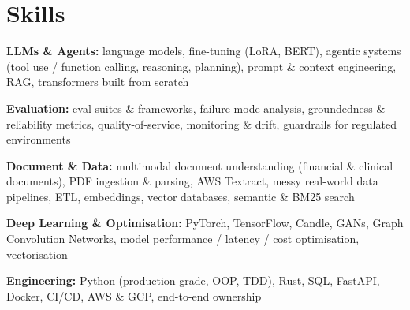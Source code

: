 \documentclass[10pt,a4paper]{article}
\begin{document}
\section{Skills}
\begin{tight}
  \item[\textcolor{accent}{\small$\bullet$}] \textbf{LLMs \& Agents:} language models, fine-tuning (LoRA, BERT), agentic systems (tool use / function calling, reasoning, planning), prompt \& context engineering, RAG, transformers built from scratch
  \item[\textcolor{accent}{\small$\bullet$}] \textbf{Evaluation:} eval suites \& frameworks, failure-mode analysis, groundedness \& reliability metrics, quality-of-service, monitoring \& drift, guardrails for regulated environments
  \item[\textcolor{accent}{\small$\bullet$}] \textbf{Document \& Data:} multimodal document understanding (financial \& clinical documents), PDF ingestion \& parsing, AWS Textract, messy real-world data pipelines, ETL, embeddings, vector databases, semantic \& BM25 search
  \item[\textcolor{accent}{\small$\bullet$}] \textbf{Deep Learning \& Optimisation:} PyTorch, TensorFlow, Candle, GANs, Graph Convolution Networks, model performance / latency / cost optimisation, vectorisation
  \item[\textcolor{accent}{\small$\bullet$}] \textbf{Engineering:} Python (production-grade, OOP, TDD), Rust, SQL, FastAPI, Docker, CI/CD, AWS \& GCP, end-to-end ownership
\end{tight}

\end{document}
